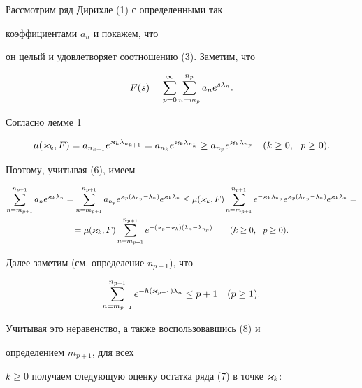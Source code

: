Рассмотрим ряд Дирихле (1) с определенными так


коэффициентами $a_n$ и покажем, что 


он целый и удовлетворяет соотношению (3). Заметим, что


\begin{equation}


F(s)=\sum_{p=0}^\i\sum_{n=m_p}^{n_p}a_ne^{s\l_n}.


\end{equation}





Согласно лемме 1


$$


\mu(\k_k,F)=a_{n_{k+1}}e^{\k_k\l_{n_{k+1}}}=a_{n_k}e^{\k_k\l_{n_k}}\ge


a_{n_p}e^{\k_k\l_{n_p}}\q (k\ge 0,\ \ p\ge 0).


$$


Поэтому, учитывая (6), имеем


\begin{gather}


\sum_{n=m_{p+1}}^{n_{p+1}}a_ne^{\k_k\l_n}= 


\sum_{n=m_{p+1}}^{n_{p+1}}a_{n_p}e^{\k_p(\l_{n_p}-\l_n)}e^{\k_k\l_n}\le


\mu(\k_k,F)\sum_{n=m_{p+1}}^{n_{p+1}}e^{-\k_k\l_{n_p}}


e^{\k_p(\l_{n_p}-\l_n)}e^{\k_k\l_n} =\notag \\


=\mu(\k_k,F)\sum_{n=m_{p+1}}^{n_{p+1}}e^{-(\k_p-\k_k)(\l_n-\l_{n_p})}\qq


(k\ge 0,\ \ p\ge 0). 


\end{gather}





Далее заметим (см. определение $n_{p+1}$), что


$$


\sum_{n=m_{p+1}}^{n_{p+1}}e^{-h(\k_{p-1})\l_n}\le p+1\q (p\ge 1).


$$


Учитывая это неравенство, а также воспользовавшись (8) и


определением $m_{p+1}$, для всех 


$k\ge0$ получаем следующую оценку остатка ряда (7) в точке $\varkappa_k$:


